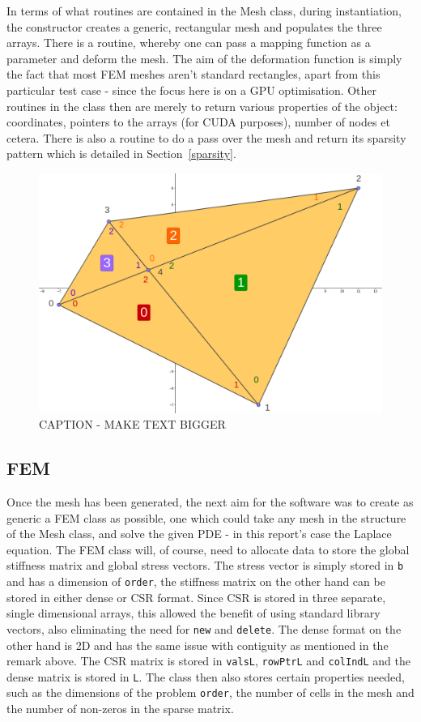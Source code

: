 In terms of what routines are contained in the Mesh class, during instantiation, the constructor creates a generic, rectangular mesh and populates the three arrays. There is a routine, whereby one can pass a mapping function as a parameter and deform the mesh. The aim of the deformation function is simply the fact that most FEM meshes aren't standard rectangles, apart from this particular test case - since the focus here is on a GPU optimisation. Other routines in the class then are merely to return various properties of the object: coordinates, pointers to the arrays (for CUDA purposes), number of nodes et cetera. There is also a routine to do a pass over the mesh and return its sparsity pattern which is detailed in Section~\ref{sparsity}.
\begin{figure}
	\centering
	\includegraphics[width = 0.6\linewidth]{Figures/4cell_example}
	\caption{CAPTION - MAKE TEXT BIGGER}
	\label{fig:4cell}
\end{figure}
\subsection{FEM}

Once the mesh has been generated, the next aim for the software was to create as generic a FEM class as possible, one which could take any mesh in the structure of the Mesh class, and solve the given PDE - in this report's case the Laplace equation. The FEM class will, of course, need to allocate data to store the global stiffness matrix and global stress vectors. The stress vector is simply stored in \texttt{b} and has a dimension of \texttt{order}, the stiffness matrix on the other hand can be stored in either dense or CSR format. Since CSR is stored in three separate, single dimensional arrays, this allowed the benefit of using standard library vectors, also eliminating the need for \texttt{new} and \texttt{delete}. The dense format on the other hand is 2D and has the same issue with contiguity as mentioned in the remark above. The CSR matrix is stored in \texttt{valsL}, \texttt{rowPtrL} and \texttt{colIndL} and the dense matrix is stored in \texttt{L}. The class then also stores certain properties needed, such as the dimensions of the problem \texttt{order}, the number of cells in the mesh and the number of non-zeros in the sparse matrix.

